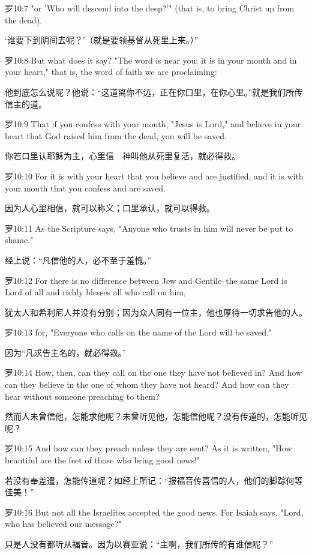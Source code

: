 \documentclass[a4paper,11pt,onecolumn,twoside]{ctexart}
\begin{document}
\begin{multicols}{2}
 罗10:7
 "or 'Who will descend into the deep?'" (that is, to bring Christ up from the dead).

 ‘谁要下到阴间去呢？’（就是要领基督从死里上来。）”


 罗10:8
 But what does it say? "The word is near you; it is in your mouth and in your heart," that is, the word of faith we are proclaiming:

 他到底怎么说呢？他说：“这道离你不远，正在你口里，在你心里。”就是我们所传信主的道。


 罗10:9
 That if you confess with your mouth, "Jesus is Lord," and believe in your heart that God raised him from the dead, you will be saved.

 你若口里认耶稣为主，心里信　神叫他从死里复活，就必得救。


 罗10:10
 For it is with your heart that you believe and are justified, and it is with your mouth that you confess and are saved.

 因为人心里相信，就可以称义；口里承认，就可以得救。


 罗10:11
 As the Scripture says, "Anyone who trusts in him will never be put to shame."

 经上说：“凡信他的人，必不至于羞愧。”


 罗10:12
 For there is no difference between Jew and Gentile--the same Lord is Lord of all and richly blesses all who call on him,

 犹太人和希利尼人并没有分别；因为众人同有一位主，他也厚待一切求告他的人。


 罗10:13
 for, "Everyone who calls on the name of the Lord will be saved."

 因为“凡求告主名的，就必得救。”


 罗10:14
 How, then, can they call on the one they have not believed in? And how can they believe in the one of whom they have not heard? And how can they hear without someone preaching to them?

 然而人未曾信他，怎能求他呢？未曾听见他，怎能信他呢？没有传道的，怎能听见呢？


 罗10:15
 And how can they preach unless they are sent? As it is written, "How beautiful are the feet of those who bring good news!"

 若没有奉差遣，怎能传道呢？如经上所记：“报福音传喜信的人，他们的脚踪何等佳美！”


 罗10:16
 But not all the Israelites accepted the good news. For Isaiah says, "Lord, who has believed our message?"

 只是人没有都听从福音。因为以赛亚说：“主啊，我们所传的有谁信呢？”



\end{multicols}
\end{document}
